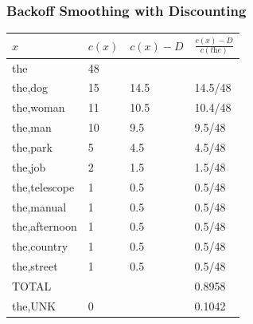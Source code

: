 \begin{frame}
\frametitle{Backoff Smoothing with Discounting}
\begin{center}
\begin{tabular}{ | l | l | l | l | }
\hline
$x$ & $c(x)$ & $c(x)-D$ & $\frac{c(x)-D}{c(\textit{the})}$ \\
\hline
the & 48 & & \\
the,dog & 15 & 14.5 & 14.5/48 \\
the,woman & 11 & 10.5 & 10.4/48 \\
the,man & 10 & 9.5 & 9.5/48 \\
the,park & 5 & 4.5 & 4.5/48 \\
the,job & 2 & 1.5 & 1.5/48 \\
the,telescope & 1 & 0.5 & 0.5/48 \\
the,manual & 1 & 0.5 & 0.5/48 \\
the,afternoon & 1 & 0.5 & 0.5/48 \\
the,country & 1 & 0.5 & 0.5/48 \\
the,street & 1 & 0.5 & 0.5/48 \\
\hline
TOTAL & & & 0.8958 \\
\hline
the,UNK & 0 & & 0.1042 \\
\hline
\end{tabular}
\end{center}
\end{frame}

